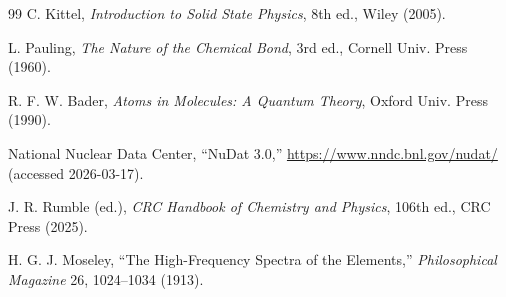 \documentclass[11pt,a4paper]{article}
\begin{document}
\begin{thebibliography}{99}
		C. Kittel, \emph{Introduction to Solid State Physics}, 8th ed., Wiley (2005).
		
		L. Pauling, \emph{The Nature of the Chemical Bond}, 3rd ed., Cornell Univ. Press (1960).
		
		R. F. W. Bader, \emph{Atoms in Molecules: A Quantum Theory}, Oxford Univ. Press (1990).
		
		National Nuclear Data Center, ``NuDat 3.0,'' \url{https://www.nndc.bnl.gov/nudat/} (accessed 2026-03-17).
		
		J. R. Rumble (ed.), \emph{CRC Handbook of Chemistry and Physics}, 106th ed., CRC Press (2025).
		
		H. G. J. Moseley, ``The High-Frequency Spectra of the Elements,'' \emph{Philosophical Magazine} 26, 1024--1034 (1913).
	\end{thebibliography}
	
\end{document}
